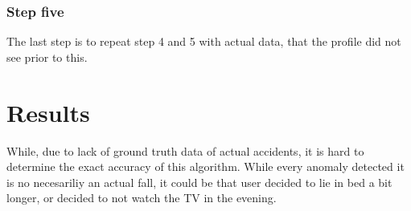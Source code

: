 \subsubsection{Step five}

The last step is to repeat step 4 and 5 with actual data, that the profile did not see prior to this. 

\section{Results}

While, due to lack of ground truth data of actual accidents, it is hard to determine the 
exact accuracy of this algorithm. While every anomaly detected it is no necesariliy an 
actual fall, it could be that user decided to lie in bed a bit longer, or decided to not watch 
the TV in the evening. 